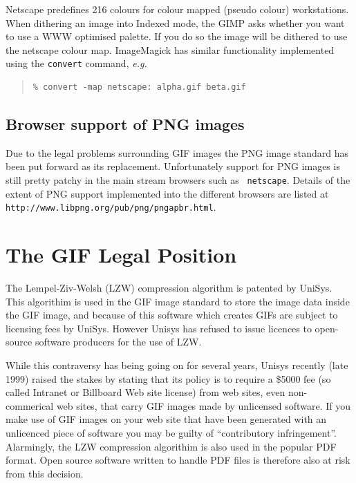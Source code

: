 \documentclass[twoside,11pt]{article}
\newcommand{\htmladdnormallink}[2]{#1}
\newcommand{\htmlref}[2]{#1}
\newcommand{\xlabel}[1]{}
\begin{document}
Netscape predefines 216 colours for colour mapped (\htmlref{pseudo
colour}{sc15_pseudo}) workstations. When dithering an image into
Indexed mode, the \htmlref{GIMP}{sc15_gimp} asks whether you want to
use a WWW optimised palette. If you do so the image will be dithered
to use the netscape colour map. \htmlref{ImageMagick}{sc15_magick} has
similar functionality implemented using the {\tt convert} command,
{\em e.g.\ }

\small
\begin{quote}
\begin{verbatim}
% convert -map netscape: alpha.gif beta.gif
\end{verbatim}
\end{quote}
\normalsize

\subsection{\xlabel{sc15_browser+png}Browser support of PNG images\label{sc15_browser+png}}

Due to the \htmlref{legal problems}{sc15_giflegal} surrounding GIF
images the PNG image standard has been put forward as its replacement.
Unfortunately support for PNG images is still pretty patchy in the
main stream browsers such as \htmladdnormallink{{\tt
netscape}}{http://www.netscape.com}. Details of the extent of PNG
support implemented into the different browsers are listed at
\htmladdnormallink{{\tt
http://www.libpng.org/pub/png/pngapbr.html}}{http://www.libpng.org/pub/png/pngapbr.html}.
    
\section{\xlabel{sc15_giflegal}The GIF Legal Position\label{sc15_giflegal}}

The Lempel-Ziv-Welsh (LZW) compression algorithm is
\htmladdnormallink{patented}{http://www.patents.ibm.com/details?pn=US04558302__}
by UniSys.  This algorithim is used in the GIF image standard to store
the image data inside the GIF image, and because of this software
which creates GIFs are subject to licensing fees by UniSys. However
Unisys has refused to issue licences to open-source software producers
for the use of LZW. 

While this contraversy has being going on for several years, Unisys
\htmladdnormallink{recently}{http://www.unisys.com/unisys/lzw/lzw-license.asp}
(late 1999) raised the stakes by stating that its policy is to require
a \$5000 fee (so called Intranet or Billboard Web site license) from
web sites, even non-commerical web sites, that carry GIF images made
by unlicensed software. If you make use of GIF images on your web site
that have been generated with an unlicenced piece of software you may
be guilty of ``contributory infringement''. Alarmingly, the LZW
compression algorithim is also used in the popular PDF format. Open
source software written to handle PDF files is therefore also at risk
from this decision.
\end{document}
